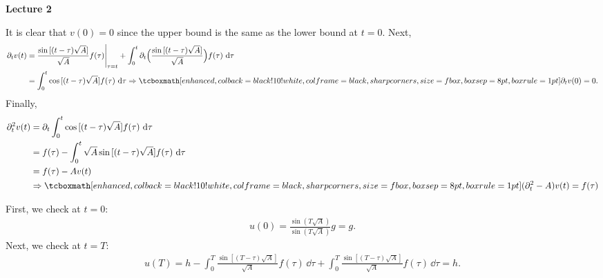 \textbf{\large Lecture 2}


It is clear that $v(0) = 0$ since the upper bound is the same as the lower bound at $t = 0$.
Next, 
\begin{align}
    \label{eq:derivative-at-0}
    \partial_{t}v(t) &= \frac{\sin{[(t-\tau)\sqrt{A}]}}{\sqrt{A}}f(\tau)\Bigg|_{\tau=t} + \int_{0}^{t}\partial_{t}\Big(\frac{\sin{[(t-\tau)\sqrt{A}]}}{\sqrt{A}}\Big)f(\tau)\, \dd{\tau} \notag \\
                     &= \int_{0}^{t} \cos{[(t-\tau)\sqrt{A}]}f(\tau)\,\dd{\tau} \Rightarrow \eqbox{\partial_{t}v(0) = 0}
.\end{align}
Finally,
\begin{align}
    \label{eq:v''}
    \partial_{t}^2v(t) &= \partial_{t} \int_{0}^{t} \cos{[(t-\tau)\sqrt{A}]}f(\tau)\, \dd{\tau} \notag \\
                       &= f(\tau) - \int_{0}^{t} \sqrt{A}\sin{[(t-\tau)\sqrt{A}]}f(\tau)\,\dd{\tau} \notag \\
                       &= f(\tau) - A v(t) \notag \\
                       &\Rightarrow \eqbox{(\partial_{t}^2-A)v(t) = f(\tau)}
\end{align}



First, we check at $t=0$:
\begin{eqnarray}
    \label{eq:check-0}
    u(0) = \frac{\sin{(T\sqrt{A})}}{\sin{(T\sqrt{A})}}g = g
.\end{eqnarray}
Next, we check at $t=T$:
\begin{eqnarray}
    \label{eq:check-T}
    u(T) = h - \int_{0}^{T} \frac{\sin[(T-\tau)\sqrt{A}]}{\sqrt{A}}f(\tau)\,\dd{\tau} + \int_{0}^{T} \frac{\sin[(T-\tau)\sqrt{A}]}{\sqrt{A}}f(\tau)\,\dd{\tau} = h
.\end{eqnarray}




